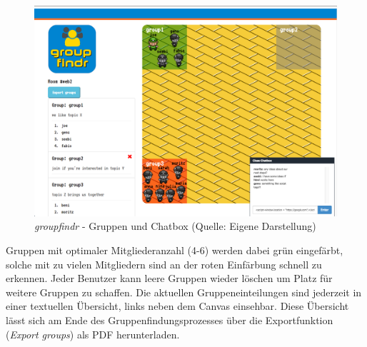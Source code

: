 \begin{figure}
\includegraphics[width=\linewidth]{graphiken/groups-and-chat.png}
\caption{\emph{groupfindr} - Gruppen und Chatbox (Quelle: Eigene Darstellung)}
\label{groupfindr_einfaerbung-chat}
\end{figure}

Gruppen mit optimaler Mitgliederanzahl (4-6) werden dabei grün eingefärbt, solche mit zu vielen Mitgliedern sind an der roten Einfärbung schnell zu erkennen.
Jeder Benutzer kann leere Gruppen wieder löschen um Platz für weitere Gruppen zu schaffen. Die aktuellen Gruppeneinteilungen sind jederzeit in einer textuellen Übersicht, links neben dem Canvas einsehbar. Diese Übersicht lässt sich am Ende des Gruppenfindungsprozesses über die Exportfunktion (\emph{Export groups}) als PDF herunterladen.
